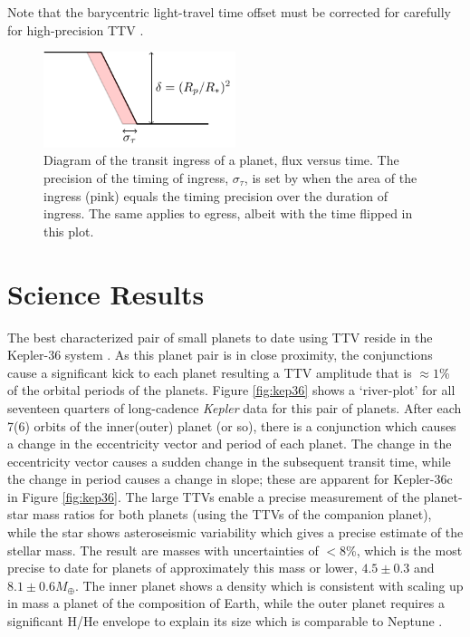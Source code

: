 \documentclass[graybox,natbib,nosecnum]{svmult}
\begin{document}
Note that the barycentric light-travel time offset must be corrected for carefully for high-precision
TTV \citep{2010PASP..122..935E}.

\begin{figure}
\centerline{
\includegraphics[width=0.5\textwidth]{ingress.pdf}}
%
\caption{Diagram of the transit ingress of a planet, flux versus time.  The precision of the timing of ingress, $\sigma_\tau$, is set by
when the area of the ingress (pink) equals the timing precision over the duration of ingress. The same applies to egress, albeit
with the time flipped in this plot.}
\label{fig:ingress}       %
\end{figure}

\section{Science Results}

The best characterized pair of small planets to date using TTV reside in the Kepler-36 system \citep{2012Sci...337..556C}.  As this planet pair is in close proximity, the conjunctions cause a significant kick to each planet resulting a TTV amplitude that is $\approx 1$\% of the orbital periods of the planets.  Figure \ref{fig:kep36} shows a `river-plot' for all seventeen quarters of long-cadence \emph{Kepler} data for this pair of planets.  After each 7(6) orbits of the inner(outer) planet (or so), there is a conjunction which causes a change in the eccentricity vector and period of each planet.  The change in the eccentricity vector causes a sudden change in the subsequent transit time, while the change in period causes a change in slope;  these are apparent for Kepler-36c in Figure \ref{fig:kep36}.  The large TTVs enable a precise measurement of the planet-star mass ratios for both planets (using the TTVs of the companion planet), while the star shows asteroseismic variability which gives a precise estimate of the stellar mass.   The result are masses with uncertainties of $<8$\%, which is the most precise to date for planets of approximately this mass or lower, $4.5\pm 0.3$ and $8.1 \pm0.6  M_\oplus$.  The inner planet shows a density which is consistent with scaling up in mass a planet of the composition of Earth, while the outer planet requires a significant H/He envelope to explain its size which is comparable to Neptune \citep{2012Sci...337..556C}.
\end{document}
